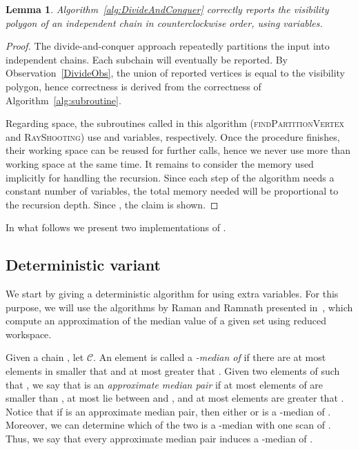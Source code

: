\documentclass[a4paper]{article}
\newtheorem{lemma}{Lemma}
\newcommand{\C}{\ensuremath{{\mathcal C}}}
\begin{document}
\begin{lemma}\label{lem_correctdiv}
Algorithm~\ref{alg:DivideAndConquer} correctly reports the visibility polygon of an independent chain in counterclockwise order, using  variables.
\end{lemma}
\begin{proof}
The divide-and-conquer approach repeatedly partitions the input into independent chains. Each subchain will eventually be reported. By Observation~\ref{DivideObs}, the union of reported vertices is equal to the visibility polygon, hence correctness is derived from the correctness of  Algorithm~\ref{alg:subroutine}.





Regarding space, the subroutines called in this algorithm (\textsc{findPartitionVertex} and \linebreak\textsc{RayShooting}) use  and  variables, respectively. Once the procedure finishes, their working space can be reused for further calls, hence we never use more than  working space at the same time. It remains to consider the memory used implicitly for handling the recursion. Since each step of the algorithm needs a constant number of variables, the total memory needed will be proportional to the recursion depth. Since , the claim is shown.
\end{proof}

In what follows we present two implementations of . 

\subsection{Deterministic variant}\label{secdeter}

We start by giving a deterministic algorithm for  using  extra variables. For this purpose, we will use the algorithms by Raman and Ramnath presented in~\cite{rr-iubtstsls-98}, which compute an approximation of the median value of a given set using reduced workspace.

Given a chain , let \C. An element  is called a \emph{-median of } if there are at most  elements in  smaller that  and at most  greater that .
Given two elements  of  such that , we say that  is an \emph{approximate median pair} if at most  elements of  are smaller than , at most  lie between  and , and at most  elements are greater that .
Notice that if  is an approximate median pair, then either  or  is a -median of .
Moreover, we can determine which of the two is a -median with one scan of . Thus, we say that every approximate median pair induces a -median of .
\end{document}
